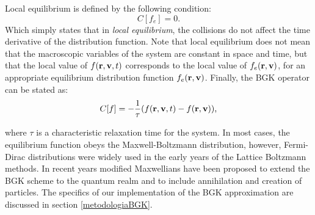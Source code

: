 Local equilibrium is defined by the following condition:
\begin{equation}
C[f_e] = 0\text{.}
\end{equation}
Which simply states that in \emph{local equilibrium}, the collisions do not affect the time derivative of the distribution function. Note that local equilibrium does not mean that the macroscopic variables of the system are constant in space and time, but that the local value of  $\f$ corresponds to the local value of $f_e(\rv)$, for an appropriate equilibrium distribution function $f_e(\rv)$. Finally, the BGK operator can be stated as:
\begin{equation}
C[f] = -\frac{1}{\tau}(\f - f(\rv)) \text{,}
\end{equation}


where $\tau$ is a characteristic relaxation time for the system. In most cases, the equilibrium function obeys the Maxwell-Boltzmann distribution, however, Fermi-Dirac distributions were widely used in the early years of the Lattice Boltzmann methods.
In recent years modified Maxwellians have been proposed to extend the BGK scheme to the quantum realm\cite{2010arXiv1009.3352F} and to include annihilation and creation of particles. The specifics of our implementation of the BGK approximation are discussed in section \ref{metodologiaBGK}.











